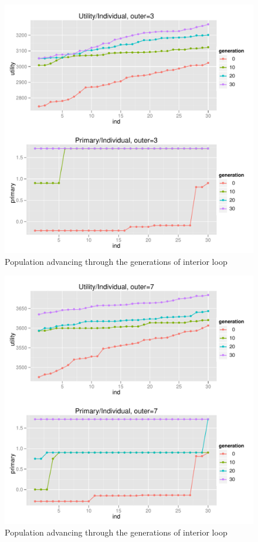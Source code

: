 \begin{figure}
  \centering \includegraphics[width=1.0\textwidth]{exp/nouncert/c2_utilind_03}
  \caption{Population advancing through the generations of interior loop}
  \label{c2_utilind_03}
\end{figure}

\begin{figure}
  \centering \includegraphics[width=1.0\textwidth]{exp/nouncert/c2_utilind_07}
  \caption{Population advancing through the generations of interior loop}
  \label{c2_utilind_07}
\end{figure}


